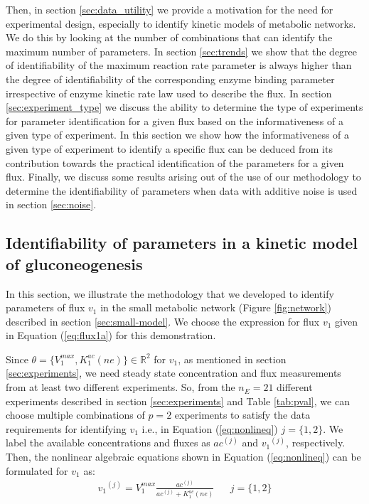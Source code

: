 \documentclass[10pt]{article}
\begin{document}
	
	Then, in section \ref{sec:data_utility} we provide a motivation for the need for experimental design, especially to identify kinetic models of metabolic networks. We do this by looking at the number of combinations that can identify the maximum number of parameters. 
	In section \ref{sec:trends} we show that the degree of identifiability of the maximum reaction rate parameter is always higher than the degree of identifiability of the corresponding enzyme binding parameter irrespective of enzyme kinetic rate law used to describe the flux. 
	In section \ref{sec:experiment_type} we discuss the ability to determine the type of experiments for parameter identification for a given flux based on the informativeness of a given type of experiment. In this section we show how the informativeness of a given type of experiment to identify a specific flux can be deduced from its contribution towards the practical identification of the parameters for a given flux. Finally, we discuss some results arising out of the use of our methodology to determine the identifiability of parameters when data with additive noise is used in section \ref{sec:noise}.
	
	\subsection{Identifiability of parameters in a kinetic model of gluconeogenesis}\label{sec:example}	
	In this section, we illustrate the methodology that we developed to identify parameters of flux $v_1$ in the small metabolic network (Figure \ref{fig:network}) described in section \ref{sec:small-model}. We choose the expression for flux $v_1$ given in Equation (\ref{eq:flux1a}) for this demonstration. 
	
	Since $\theta = \{V_1^{max}, K_1^{ac} (ne)\} \in \mathbb{R}^2$ for $v_1$, as mentioned in section \ref{sec:experiments}, we need steady state concentration and flux measurements from at least two different experiments. So, from the $n_E = 21$ different experiments described in section \ref{sec:experiments} and Table \ref{tab:pval}, we can choose multiple combinations of $p = 2$ experiments to satisfy the data requirements for identifying $v_1$ i.e., in Equation (\ref{eq:nonlineq}) $j = \{1, 2\}$. We label the available concentrations and fluxes as ${ac}^{(j)}$ and ${v_1}^{(j)}$, respectively. Then, the nonlinear algebraic equations shown in Equation (\ref{eq:nonlineq}) can be formulated for $v_1$ as:
	\begin{align*}%
	{v_1}^{(j)} = V_{1}^{max}\frac{ac^{(j)}}{ac^{(j)}+K_{1}^{ac}(ne)} &&  j=\{1, 2\}
	\end{align*}
	
\end{document}

